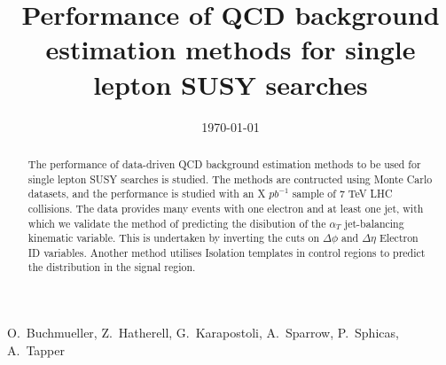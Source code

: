 \documentclass[a4, 10pt]{cmspaper}
\begin{document}

\begin{titlepage}

   \date{\today}

 \title{Performance of QCD background estimation methods for single lepton SUSY searches}

 \begin{Authlist}
   O.~Buchmueller, Z.~Hatherell, G.~Karapostoli, A.~Sparrow, P.~Sphicas,
	A.~Tapper
   \end{Authlist}

\begin{abstract}
The performance of data-driven QCD background estimation methods to be used for single lepton SUSY searches is studied. The methods are contructed using Monte Carlo datasets, and the performance is studied with an X $pb^{-1}$ sample of 7 TeV LHC collisions. The data provides many events with one electron and at least one jet, with which we validate the method of predicting the disibution of the $\alpha_{T}$ jet-balancing kinematic variable. This is undertaken by inverting the cuts on $\Delta \phi$ and $\Delta \eta$ Electron ID variables. Another method utilises Isolation templates in control regions to predict the distribution in the signal region. 
\end{abstract}


\end{titlepage}

\tableofcontents
\newpage
\setcounter{page}{2}














\clearpage
\end{document}
